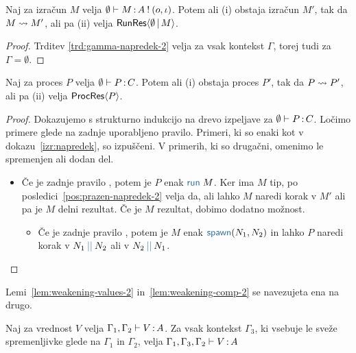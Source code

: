 \begin{posledica}[o napredku]\label{pos:prazen-napredek-2}
	Naj za izračun $M$ velja $\emptyset \vdash M \mathinner{:} A \mathbin{!} (o, \iota)$. Potem ali (i) obstaja izračun $M'$, tak da $M \leadsto M'$, ali pa (ii) velja $\mathsf{RunRes}\langle\emptyset \,\vert\, M\rangle$.
\end{posledica}

\begin{proof}
	Trditev \ref{trd:gamma-napredek-2} velja za vsak kontekst $\Gamma$, torej tudi za $\Gamma = \emptyset$.
\end{proof}


\begin{izrek}[o napredku]
	Naj za proces $P$ velja $\emptyset \vdash P \mathinner{:} C$. Potem ali (i) obstaja proces $P'$, tak da $P \leadsto P'$, ali pa (ii) velja $\mathsf{ProcRes}\langle P \rangle$.
\end{izrek}

\begin{proof}
	Dokazujemo s strukturno indukcijo na drevo izpeljave za $\emptyset \vdash P \mathinner{:} C$.
	Ločimo primere glede na zadnje uporabljeno pravilo.
	Primeri, ki so enaki kot v dokazu~\ref{izr:napredek}, so izpuščeni. V primerih, ki so drugačni, omenimo le spremenjen ali dodan del.
	
	\begin{itemize}
		\item Če je zadnje pravilo , potem je $P$ enak $\tmrun{M}$. Ker ima $M$ tip, po posledici~\ref{pos:prazen-napredek-2} velja da, ali lahko $M$ naredi korak v $M'$ ali pa je $M$ delni rezultat.
		Če je $M$ rezultat, dobimo dodatno možnost.
		\begin{itemize}
			\item Če je zadnje pravilo , potem je $M$ enak $\tmspawn{N_1}{N_2}$ in lahko $P$ naredi korak v $\tmpar{N_1}{N_2}$ ali v $\tmpar{N_2}{N_1}$.
		\end{itemize}		
	\end{itemize}
\end{proof}

Lemi~\ref{lem:weakening-values-2} in~\ref{lem:weakening-comp-2} se navezujeta ena na drugo.

\begin{lema}\label{lem:weakening-values-2}
	Naj za vrednost $V$ velja $\Gamma_1, \Gamma_2 \vdash V \mathinner{:} A$. Za vsak kontekst $\Gamma_3$, ki vsebuje le sveže spremenljivke glede na $\Gamma_1$ in $\Gamma_2$, velja $\Gamma_1, \Gamma_3, \Gamma_2 \vdash V \mathinner{:} A$
\end{lema}

